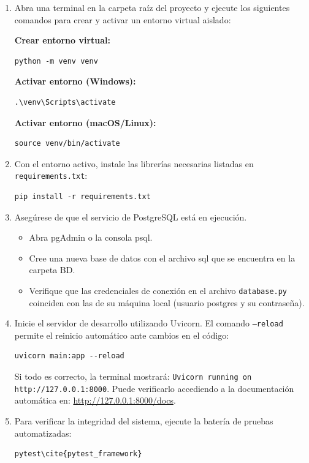 \begin{enumerate}
    \item Abra una terminal en la carpeta raíz del proyecto y ejecute los siguientes comandos para crear y activar un entorno virtual aislado:
    
    \textbf{Crear entorno virtual:}
\begin{verbatim}
python -m venv venv
\end{verbatim}

    \textbf{Activar entorno (Windows):}
\begin{verbatim}
.\venv\Scripts\activate
\end{verbatim}

    \textbf{Activar entorno (macOS/Linux):}
\begin{verbatim}
source venv/bin/activate
\end{verbatim}

    \item Con el entorno activo, instale las librerías necesarias listadas en \texttt{requirements.txt}:
\begin{verbatim}
pip install -r requirements.txt
\end{verbatim}

    \item Asegúrese de que el servicio de PostgreSQL está en ejecución.
    \begin{itemize}
        \item Abra pgAdmin o la consola psql.
        \item Cree una nueva base de datos con el archivo sql que se encuentra en la carpeta BD.
        \item Verifique que las credenciales de conexión en el archivo \texttt{database.py} coinciden con las de su máquina local (usuario postgres y su contraseña).
    \end{itemize}

    \item Inicie el servidor de desarrollo utilizando Uvicorn. El comando \texttt{--reload} permite el reinicio automático ante cambios en el código:
\begin{verbatim}
uvicorn main:app --reload
\end{verbatim}
    Si todo es correcto, la terminal mostrará: \texttt{Uvicorn running on http://127.0.0.1:8000}. Puede verificarlo accediendo a la documentación automática en: \url{http://127.0.0.1:8000/docs}.

    \item Para verificar la integridad del sistema, ejecute la batería de pruebas automatizadas:
\begin{verbatim}
pytest\cite{pytest_framework}
\end{verbatim}
\end{enumerate}

